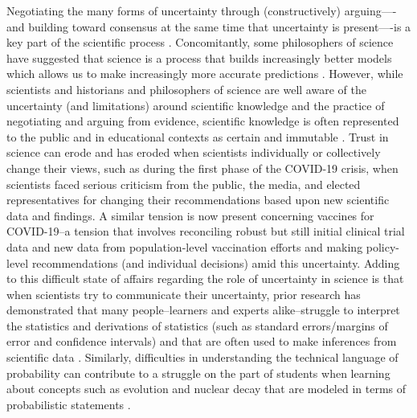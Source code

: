\documentclass[man]{apa7}
\begin{document}
Negotiating the many forms of uncertainty through (constructively) arguing—-and building toward consensus at the same time that uncertainty is present—-is a key part of the scientific process \parencite{duschl2008science, t00, nrc12}. Concomitantly, some philosophers of science have suggested that science is a process that builds increasingly better models which allows us to make increasingly more accurate predictions \parencite{g10, g06, n02, r77}. However, while scientists and historians and philosophers of science are well aware of the uncertainty (and limitations) around scientific knowledge and the practice of negotiating and arguing from evidence, scientific knowledge is often represented to the public and in educational contexts as certain and immutable \parencite{d90}. Trust in science can erode and has eroded when scientists individually or collectively change their views, such as during the first phase of the COVID-19 crisis, when scientists faced serious criticism from the public, the media, and elected representatives for changing their recommendations based upon new scientific data and findings. A similar tension is now present concerning vaccines for COVID-19--a tension that involves reconciling robust but still initial clinical trial data and new data from population-level vaccination efforts and making policy-level recommendations (and individual decisions) amid this uncertainty.
Adding to this difficult state of affairs regarding the role of uncertainty in science is that when scientists try to communicate their uncertainty, prior research has demonstrated that many people–learners and experts alike–struggle to interpret the statistics and derivations of statistics (such as standard errors/margins of error and confidence intervals) and that are often used to make inferences from scientific data \parencite{gkv04, s07, tk74}. Similarly, difficulties in understanding the technical language of probability can contribute to a struggle on the part of students when learning about concepts such as evolution and nuclear decay that are modeled in terms of probabilistic statements \parencite{fth17}.
\end{document}
